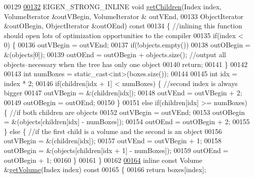 \begin{DoxyCode}
00129 
\hyperlink{class_eigen_1_1_kd_b_v_h_a67326b18fcf16f341d2e4a16006d0205}{00132}   EIGEN\_STRONG\_INLINE \textcolor{keywordtype}{void} \hyperlink{class_eigen_1_1_kd_b_v_h_a67326b18fcf16f341d2e4a16006d0205}{getChildren}(Index index, VolumeIterator &outVBegin, VolumeIterator &
      outVEnd,
00133                                        ObjectIterator &outOBegin, ObjectIterator &outOEnd)\textcolor{keyword}{ const}
00134 \textcolor{keyword}{  }\{ \textcolor{comment}{//inlining this function should open lots of optimization opportunities to the compiler}
00135     \textcolor{keywordflow}{if}(index < 0) \{
00136       outVBegin = outVEnd;
00137       \textcolor{keywordflow}{if}(!objects.empty())
00138         outOBegin = &(objects[0]);
00139       outOEnd = outOBegin + objects.size(); \textcolor{comment}{//output all objects--necessary when the tree has only one
       object}
00140       \textcolor{keywordflow}{return};
00141     \}
00142 
00143     \textcolor{keywordtype}{int} numBoxes = \textcolor{keyword}{static\_cast<}\textcolor{keywordtype}{int}\textcolor{keyword}{>}(boxes.size());
00144 
00145     \textcolor{keywordtype}{int} idx = index * 2;
00146     \textcolor{keywordflow}{if}(children[idx + 1] < numBoxes) \{ \textcolor{comment}{//second index is always bigger}
00147       outVBegin = &(children[idx]);
00148       outVEnd = outVBegin + 2;
00149       outOBegin = outOEnd;
00150     \}
00151     \textcolor{keywordflow}{else} \textcolor{keywordflow}{if}(children[idx] >= numBoxes) \{ \textcolor{comment}{//if both children are objects}
00152       outVBegin = outVEnd;
00153       outOBegin = &(objects[children[idx] - numBoxes]);
00154       outOEnd = outOBegin + 2;
00155     \} \textcolor{keywordflow}{else} \{ \textcolor{comment}{//if the first child is a volume and the second is an object}
00156       outVBegin = &(children[idx]);
00157       outVEnd = outVBegin + 1;
00158       outOBegin = &(objects[children[idx + 1] - numBoxes]);
00159       outOEnd = outOBegin + 1;
00160     \}
00161   \}
00162 
\hyperlink{class_eigen_1_1_kd_b_v_h_a59e7a2afb19fe7ae919fb95425bd6bf0}{00164}   \textcolor{keyword}{inline} \textcolor{keyword}{const} Volume &\hyperlink{class_eigen_1_1_kd_b_v_h_a59e7a2afb19fe7ae919fb95425bd6bf0}{getVolume}(Index index)\textcolor{keyword}{ const}
00165 \textcolor{keyword}{  }\{
00166     \textcolor{keywordflow}{return} boxes[index];

\end{DoxyCode}
